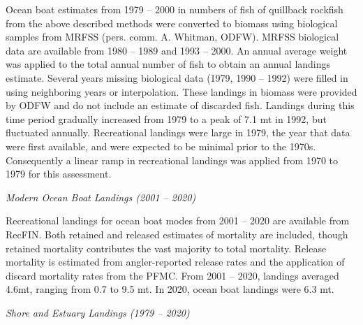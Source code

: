 \documentclass[11pt,
  english,
  a4paper,
]{article}
\begin{document}
\leavevmode\tagmcend\tagstructend\par


Ocean boat estimates from 1979 -- 2000 in numbers of fish of quillback rockfish from the above described methods were converted to biomass using biological samples from MRFSS (pers. comm. A. Whitman, ODFW). MRFSS biological data are available from 1980 -- 1989 and 1993 -- 2000. An annual average weight was applied to the total annual number of fish to obtain an annual landings estimate. Several years missing biological data (1979, 1990 -- 1992) were filled in using neighboring years or interpolation. These landings in biomass were provided by ODFW and do not include an estimate of discarded fish. Landings during this time period gradually increased from 1979 to a peak of 7.1 mt in 1992, but fluctuated annually. Recreational landings were large in 1979, the year that data were first available, and were expected to be minimal prior to the 1970s. Consequently a linear ramp in recreational landings was applied from 1970 to 1979 for this assessment.

\leavevmode\tagmcend\tagstructend\par


\emph{Modern Ocean Boat Landings (2001 -- 2020)}

\leavevmode\tagmcend\tagstructend\par


Recreational landings for ocean boat modes from 2001 -- 2020 are available from RecFIN. Both retained and released estimates of mortality are included, though retained mortality contributes the vast majority to total mortality. Release mortality is estimated from angler-reported release rates and the application of discard mortality rates from the PFMC. From 2001 -- 2020, landings averaged 4.6mt, ranging from 0.7 to 9.5 mt. In 2020, ocean boat landings were 6.3 mt.

\leavevmode\tagmcend\tagstructend\par


\emph{Shore and Estuary Landings (1979 -- 2020)}

\leavevmode\tagmcend\tagstructend\par
\end{document}
